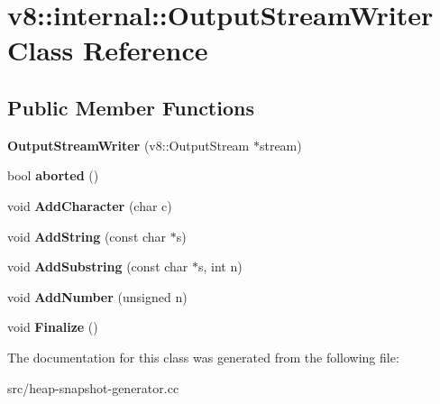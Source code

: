 \hypertarget{classv8_1_1internal_1_1_output_stream_writer}{}\section{v8\+:\+:internal\+:\+:Output\+Stream\+Writer Class Reference}
\label{classv8_1_1internal_1_1_output_stream_writer}
\subsection*{Public Member Functions}
\begin{DoxyCompactItemize}
\item 
\hypertarget{classv8_1_1internal_1_1_output_stream_writer_af20c1920eef3070065347358f0a52bfb}{}{\bfseries Output\+Stream\+Writer} (v8\+::\+Output\+Stream $\ast$stream)\label{classv8_1_1internal_1_1_output_stream_writer_af20c1920eef3070065347358f0a52bfb}

\item 
\hypertarget{classv8_1_1internal_1_1_output_stream_writer_a786eee01911e2c412d67422a8fe86265}{}bool {\bfseries aborted} ()\label{classv8_1_1internal_1_1_output_stream_writer_a786eee01911e2c412d67422a8fe86265}

\item 
\hypertarget{classv8_1_1internal_1_1_output_stream_writer_abe84a4a8672b458c1eda763295bba60e}{}void {\bfseries Add\+Character} (char c)\label{classv8_1_1internal_1_1_output_stream_writer_abe84a4a8672b458c1eda763295bba60e}

\item 
\hypertarget{classv8_1_1internal_1_1_output_stream_writer_a2b4529a2584f920315a66814489eb214}{}void {\bfseries Add\+String} (const char $\ast$s)\label{classv8_1_1internal_1_1_output_stream_writer_a2b4529a2584f920315a66814489eb214}

\item 
\hypertarget{classv8_1_1internal_1_1_output_stream_writer_a2626cd836862fffbbfac9f9e3542a357}{}void {\bfseries Add\+Substring} (const char $\ast$s, int n)\label{classv8_1_1internal_1_1_output_stream_writer_a2626cd836862fffbbfac9f9e3542a357}

\item 
\hypertarget{classv8_1_1internal_1_1_output_stream_writer_a35497ea28ddc99160026a0c28d49e160}{}void {\bfseries Add\+Number} (unsigned n)\label{classv8_1_1internal_1_1_output_stream_writer_a35497ea28ddc99160026a0c28d49e160}

\item 
\hypertarget{classv8_1_1internal_1_1_output_stream_writer_af1025ba7918a92345913bec1ba5a0bce}{}void {\bfseries Finalize} ()\label{classv8_1_1internal_1_1_output_stream_writer_af1025ba7918a92345913bec1ba5a0bce}

\end{DoxyCompactItemize}


The documentation for this class was generated from the following file\+:\begin{DoxyCompactItemize}
\item 
src/heap-\/snapshot-\/generator.\+cc\end{DoxyCompactItemize}
